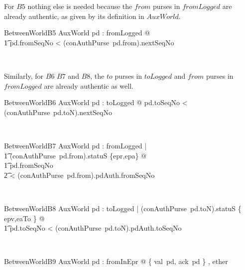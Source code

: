 For $B5$ nothing else is needed because the $from$ purses in $fromLogged$ are already authentic,
as given by its definition in $AuxWorld$.
%
\begin{LNewSDef}
\begin{schema}{BetweenWorldB5}
   AuxWorld
\where
    \forall pd : fromLogged @
  \\ %
  \t1 pd.fromSeqNo < (conAuthPurse~pd.from).nextSeqNo
\end{schema}~\end{LNewSDef}

Similarly, for $B6$ $B7$ and $B8$, the $to$ purses in $toLogged$ and $from$ purses in $fromLogged$
are already authentic as well.
%
\begin{LNewSDef}
\begin{schema}{BetweenWorldB6}
   AuxWorld
\where
   \forall pd : toLogged @ pd.toSeqNo < (conAuthPurse~pd.toN).nextSeqNo
\end{schema}~\end{LNewSDef}

\begin{LNewSDef}
\begin{schema}{BetweenWorldB7}
   AuxWorld
\where
\forall pd : fromLogged |
  \\ %
  \t1 (conAuthPurse~pd.from).statuS \in \{epr,epa\} @
  \\ %
  \t1 pd.fromSeqNo
  \\ %
  \t2 < (conAuthPurse~pd.from).pdAuth.fromSeqNo
\end{schema}~\end{LNewSDef}

\begin{LNewSDef}
\begin{schema}{BetweenWorldB8}
   AuxWorld
\where
\forall pd : toLogged | (conAuthPurse~pd.toN).statuS \in \{
  epv,eaTo \} @
  \\ %
  \t1 pd.toSeqNo < (conAuthPurse~pd.toN).pdAuth.toSeqNo
\end{schema}~\end{LNewSDef}

\begin{LNewSDef}
\begin{schema}{BetweenWorldB9}
   AuxWorld
\where
\forall pd : fromInEpr @ \disjoint \langle \{ val~pd, ack~pd \} ,
  ether \rangle
\end{schema}~\end{LNewSDef}

